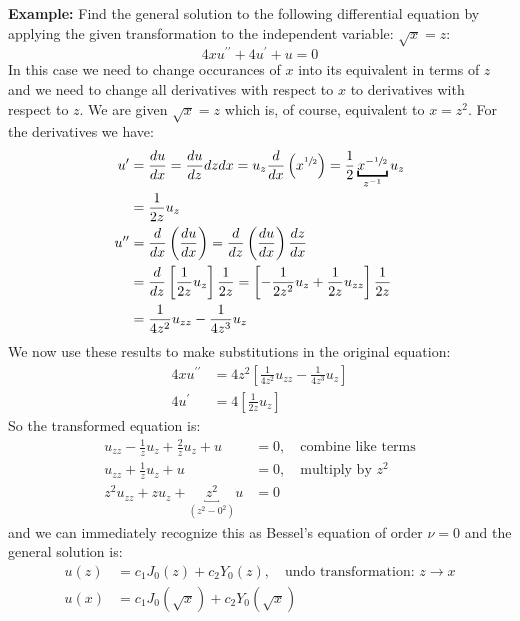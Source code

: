\noindent\textbf{Example:} Find the general solution to the following differential equation by applying the given transformation to the independent variable: $\sqrt{x} = z$:
\begin{equation*}
4xu^{\prime \prime} + 4u^{\prime} + u = 0
\end{equation*}
In this case we need to change occurances of $x$ into its equivalent in terms of $z$ and we need to change all derivatives with respect to $x$ to derivatives with respect to $z$.  We are given $\sqrt{x}=z$ which is, of course, equivalent to $x = z^2$.  For the derivatives we have:
\begin{align*}
u^{\prime} &= \frac{du}{dx} = \frac{du}{dz}{dz}{dx} = u_z\frac{d}{dx}\left(x^{\sfrac{1}{2}}\right) = \frac{1}{2}\underbracket{x^{-\sfrac{1}{2}}}_{z^{-1}}u_z  \\
&=\frac{1}{2z}u_z \\
u^{\prime \prime} &= \frac{d}{dx}\left(\frac{du}{dx} \right) = \frac{d}{dz}\left(\frac{du}{dx}\right)\frac{dz}{dx} \\
&=\frac{d}{dz}\left[\frac{1}{2z}u_z\right]\frac{1}{2z} = \left[-\frac{1}{2z^2}u_z + \frac{1}{2z}u_{zz} \right] \frac{1}{2z} \\
&=\frac{1}{4z^2}u_{zz}-\frac{1}{4z^3}u_z
\end{align*}
We now use these results to make substitutions in the original equation:
\begin{align*}
4xu^{\prime \prime} &= 4z^2\left[\frac{1}{4z^2}u_{zz}-\frac{1}{4z^3}u_z \right] \\
4u^{\prime} &= 4\left[\frac{1}{2z}u_z\right]
\end{align*}
So the transformed equation is:
\begin{align*}
u_{zz}-\frac{1}{z}u_z + \frac{2}{z}u_z + u &= 0, \ \ \ \text{ combine like terms}\\
u_{zz} + \frac{1}{z}u_z + u &= 0, \ \ \ \text{ multiply by }z^2 \\
z^2u_{zz} + zu_{z} + \underbracket{z^2}_{\left(z^2-0^2\right)}u &= 0
\end{align*}
and we can immediately recognize this as Bessel's equation of order $\nu = 0$ and the general solution is:
\begin{align*}
u(z) &= c_1J_0(z) + c_2Y_0(z), \ \ \ \text{ undo transformation: }z\to x \\
u(x) &= c_1J_0(\sqrt{x}) + c_2Y_0(\sqrt{x})
\end{align*}


